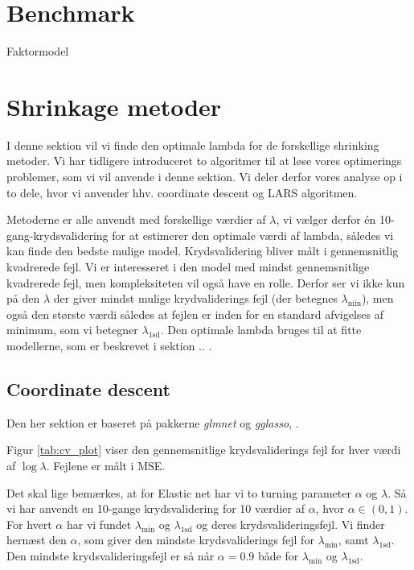 \section{Benchmark}
Faktormodel


\section{Shrinkage metoder}
I denne sektion vil vi finde den optimale lambda for de forskellige shrinking metoder. 
Vi har tidligere introduceret to algoritmer til at løse vores optimerings problemer, som vi vil anvende i denne sektion.
Vi deler derfor vores analyse op i to dele, hvor vi anvender hhv. coordinate descent og LARS algoritmen.

Metoderne er alle anvendt med forskellige værdier af $\lambda$, vi vælger derfor én 10-gang-krydsvalidering for at estimerer den optimale værdi af lambda, således vi kan finde den bedste mulige model. 
Krydsvalidering bliver målt i gennemsnitlig kvadrerede fejl. 
Vi er interesseret i den model med mindst gennemsnitlige kvadrerede fejl, men kompleksiteten vil også have en rolle.
Derfor ser vi ikke kun på den $\lambda$ der giver mindst mulige krydvaliderings fejl (der betegnes $\lambda_{\min}$), men også den største værdi således at fejlen er inden for en standard afvigelses af minimum, som vi betegner $\lambda_{\text{1sd}}$.  
Den optimale lambda bruges til at fitte modellerne, som er beskrevet i sektion .. .  

\subsection{Coordinate descent}
Den her sektion er baseret på pakkerne \textit{glmnet} og \textit{gglasso}, \citep{gglasso}.

Figur \ref{tab:cv_plot} viser den gennemsnitlige krydsvaliderings fejl for hver værdi af $\log \lambda$.
Fejlene er målt i MSE.

Det skal lige bemærkes, at for Elastic net har vi to turning parameter $\alpha$ og $\lambda$. 
Så vi har anvendt en 10-gange krydsvalidering for 10 værdier af $\alpha$, hvor $\alpha \in (0,1)$. 
For hvert $\alpha$ har vi fundet $\lambda_{\min}$ og $\lambda_{1\text{sd}}$ og deres krydsvalideringsfejl. Vi finder hernæst den $\alpha$, som giver den mindste krydsvaliderings fejl for $\lambda_{\min}$, samt $\lambda_{1\text{sd}}$. 
Den mindste krydsvalideringsfejl er så når  $\alpha = 0.9$ både for $\lambda_{\min}$ og $\lambda_{1\text{sd}}$. 


